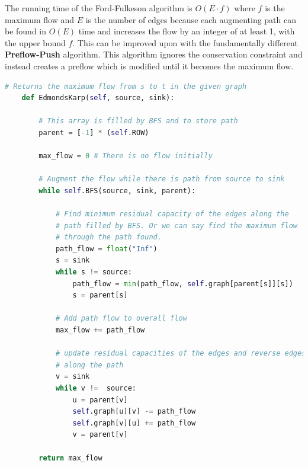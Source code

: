 \documentclass[12pt]{article} %
\begin{document}
\par The running time of the Ford-Fulkeson algorithm is $O(E \cdot f)$ where $f$ is the maximum flow and $E$ is the number of edges because each augmenting path can be found in $O(E)$ time and increases the flow by an integer of at least 1, with the upper bound $f$. This can be improved upon with the fundamentally different \textbf{Preflow-Push} algorithm. This algorithm ignores the conservation constraint and instead creates a preflow which is modified until it becomes the maximum flow.

\begin{lstlisting}[language=Python, caption=Edmonds-Karp in Python]
# Returns the maximum flow from s to t in the given graph
    def EdmondsKarp(self, source, sink):
 
        # This array is filled by BFS and to store path
        parent = [-1] * (self.ROW)
 
        max_flow = 0 # There is no flow initially
 
        # Augment the flow while there is path from source to sink
        while self.BFS(source, sink, parent):
 
            # Find minimum residual capacity of the edges along the
            # path filled by BFS. Or we can say find the maximum flow
            # through the path found.
            path_flow = float("Inf")
            s = sink
            while s != source:
                path_flow = min(path_flow, self.graph[parent[s]][s])
                s = parent[s]
 
            # Add path flow to overall flow
            max_flow += path_flow
 
            # update residual capacities of the edges and reverse edges
            # along the path
            v = sink
            while v !=  source:
                u = parent[v]
                self.graph[u][v] -= path_flow
                self.graph[v][u] += path_flow
                v = parent[v]
 
        return max_flow
\end{lstlisting}
\end{document}
